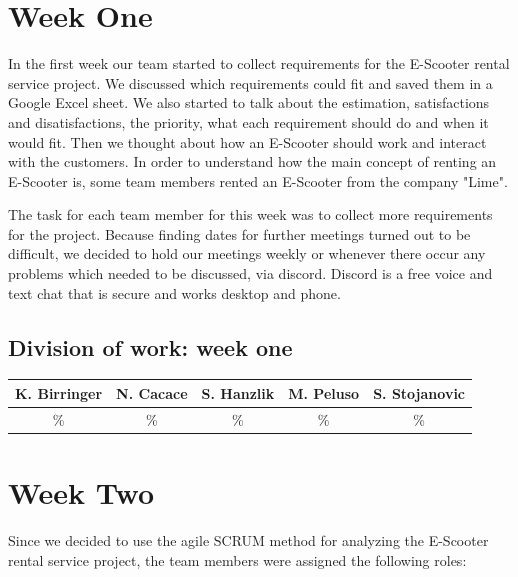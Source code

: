 \documentclass[a4paper, 12pt]{article}
\begin{document}

\section{Week One}
In the first week our team started to collect requirements for the E-Scooter rental service project. We discussed which requirements could fit and saved them in a Google Excel sheet. We also started to talk about the estimation, satisfactions and disatisfactions, the priority, what each requirement should do and when it would fit.
Then we thought about how an E-Scooter should work and interact with the customers.
In order to understand how the main concept of renting an E-Scooter is, some team members rented an E-Scooter from the company "Lime".

The task for each team member for this week was to collect more requirements for the project.
Because finding dates for further meetings turned out to be difficult, we decided to hold our meetings weekly or whenever there occur any problems which needed to be discussed, via discord. Discord is a free voice and text chat that is secure and works desktop and phone. \cite{discord}

\subsection{Division of work: week one}
\begin{table}[h]
\centering
\setlength{\tabcolsep}{12pt}
\begin{tabular}{|c|c|c|c|c|}
\hline
K. Birringer & N. Cacace & S. Hanzlik & M. Peluso & S. Stojanovic\\
\hline
\% & \% & \% & \% & \% \\ 
\hline
\end{tabular}
\end{table}

\section{Week Two}
Since we decided to use the agile SCRUM method for analyzing the E-Scooter rental service project, the team members were assigned the following roles:
\end{document}
